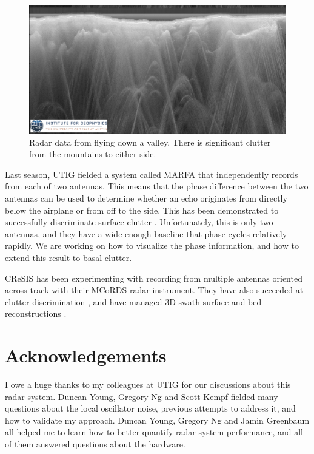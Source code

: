 \documentclass[11pt]{article}
\begin{document}
\begin{figure}[ht!]
\centering
\includegraphics[width=0.8\columnwidth]{figures/ICP2_JKB1a_F09T01a_full.png}
\caption[]{Radar data from flying down a valley. There is significant clutter from the mountains to either side.}
\label{fig:off_nadir_mountains}
\end{figure}

Last season, UTIG fielded a system called MARFA that independently records from each of two antennas. 
This means that the phase difference between the two antennas can be used to determine whether an echo originates from directly below the airplane or from off to the side.
This has been demonstrated to successfully discriminate surface clutter \cite{Castelletti2015}.
Unfortunately, this is only two antennas, and they have a wide enough baseline that phase cycles relatively rapidly. 
We are working on how to visualize the phase information, and how to extend this result to basal clutter.

CReSIS has been experimenting with recording from multiple antennas oriented across track with their MCoRDS radar instrument.
They have also succeeded at clutter discrimination \cite{Gogineni2014}, and have managed 3D swath surface and bed reconstructions \cite{Wu2011}.

\section*{Acknowledgements}
I owe a huge thanks to my colleagues at UTIG for our discussions about this radar system. 
Duncan Young, Gregory Ng and Scott Kempf fielded many questions about the local oscillator noise, previous attempts to address it, and how to validate my approach. 
Duncan Young, Gregory Ng and Jamin Greenbaum all helped me to learn how to better quantify radar system performance, and all of them answered questions about the hardware.

{\footnotesize {}}
 
\end{document}
